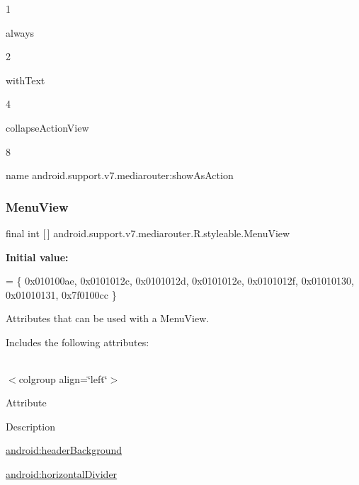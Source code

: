 1

{\ttfamily always}

2

{\ttfamily with\+Text}

4

{\ttfamily collapse\+Action\+View}

8

name android.\+support.\+v7.\+mediarouter\+:show\+As\+Action \mbox{\label{classandroid_1_1support_1_1v7_1_1mediarouter_1_1R_1_1styleable_a1d8b1d577f8163d3bb95f228f10016c7}} 
\subsubsection{\texorpdfstring{Menu\+View}{MenuView}}
{\footnotesize\ttfamily final int \mbox{[}$\,$\mbox{]} android.\+support.\+v7.\+mediarouter.\+R.\+styleable.\+Menu\+View\hspace{0.3cm}{\ttfamily [static]}}

{\bfseries Initial value\+:}
\begin{DoxyCode}
= \{
            0x010100ae, 0x0101012c, 0x0101012d, 0x0101012e,
            0x0101012f, 0x01010130, 0x01010131, 0x7f0100cc
        \}
\end{DoxyCode}
Attributes that can be used with a Menu\+View. 

Includes the following attributes\+:

\tabulinesep=1mm
\begin{longtabu} spread 0pt [c]{*{0}{|X[-1]}|}
\hline
\end{longtabu}
$<$colgroup align=\char`\"{}left\char`\"{}$>$ 

Attribute

Description 

{\ttfamily \hyperlink{classandroid_1_1support_1_1v7_1_1mediarouter_1_1R_1_1styleable_a2de4fb6def01d6c4b2d7cc86e961a58d}{android\+:header\+Background}}

{\ttfamily \hyperlink{classandroid_1_1support_1_1v7_1_1mediarouter_1_1R_1_1styleable_a0dfdc070e508eda10bc6aec3af09d0b9}{android\+:horizontal\+Divider}}


